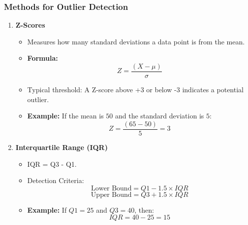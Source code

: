 \documentclass[aspectratio=169]{beamer}
\begin{document}
\begin{frame}
    \frametitle{Methods for Outlier Detection}
    \begin{enumerate}
        \item \textbf{Z-Scores}
        \begin{itemize}
            \item Measures how many standard deviations a data point is from the mean.
            \item \textbf{Formula:} 
            \begin{equation}
                Z = \frac{(X - \mu)}{\sigma}
            \end{equation}
            \item Typical threshold: A Z-score above +3 or below -3 indicates a potential outlier.
            \item \textbf{Example:} If the mean is \(50\) and the standard deviation is \(5\):
                \begin{equation}
                    Z = \frac{(65 - 50)}{5} = 3
                \end{equation}
        \end{itemize}

        \item \textbf{Interquartile Range (IQR)}
        \begin{itemize}
            \item IQR = Q3 - Q1.
            \item Detection Criteria:
            \begin{equation}
                \text{Lower Bound} = Q1 - 1.5 \times IQR
            \end{equation}
            \begin{equation}
                \text{Upper Bound} = Q3 + 1.5 \times IQR
            \end{equation}
            \item \textbf{Example:} If \(Q1 = 25\) and \(Q3 = 40\), then:
                \begin{equation}
                    IQR = 40 - 25 = 15
                \end{equation}
        \end{itemize}
    \end{enumerate}
\end{frame}
\end{document}
